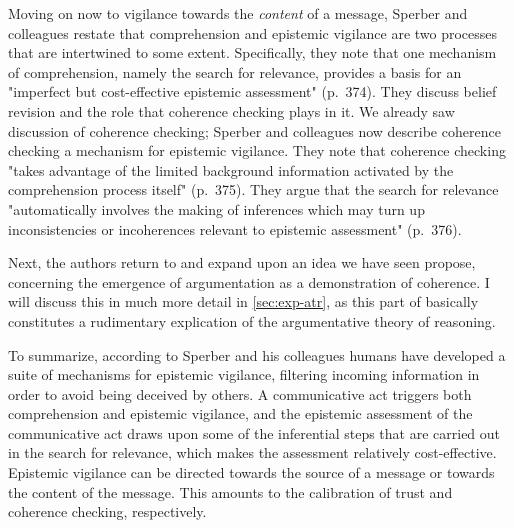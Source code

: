 
Moving on now to vigilance towards the \emph{content} of a message, Sperber and colleagues restate that comprehension and epistemic vigilance are two processes that are intertwined to some extent. Specifically, they note that one mechanism of comprehension, namely the search for relevance, provides a basis for an "imperfect but cost-effective epistemic assessment" (p.~374).
They discuss belief revision and the role that coherence checking plays in it. We already saw  discussion of coherence checking; Sperber and colleagues now describe coherence checking a mechanism for epistemic vigilance. They note that coherence checking "takes advantage of the limited background information activated by the comprehension process itself" (p.~375). They argue that the search for relevance "automatically involves the making of inferences which may turn up inconsistencies or incoherences relevant to epistemic assessment" (p.~376).

Next, the authors return to and expand upon an idea we have seen \citet{Sperber01} propose, concerning the emergence of argumentation as a demonstration of coherence. I will discuss this in much more detail in \cref{sec:exp-atr}, as this part of \citet{Sperber10} basically constitutes a rudimentary explication of the argumentative theory of reasoning.


To summarize, according to Sperber and his colleagues humans have developed a suite of mechanisms for epistemic vigilance, filtering incoming information in order to avoid being deceived by others. A communicative act triggers both comprehension and epistemic vigilance, and the epistemic assessment of the communicative act draws upon some of the inferential steps that are carried out in the search for relevance, which makes the assessment relatively cost-effective. Epistemic vigilance can be directed towards the source of a message or towards the content of the message. This amounts to the calibration of trust and coherence checking, respectively.
